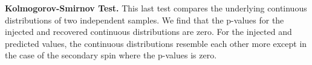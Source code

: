 \documentclass[aps,prd,twocolumn,superscriptaddress,preprintnumbers,floatfix,nofootinbib]{revtex4-2}
\begin{document}
\textbf{Kolmogorov-Smirnov Test.} This last test compares the underlying 
continuous distributions of two independent samples. We find that the p-values
for the injected and recovered continuous distributions are zero. For the
injected and predicted values, the continuous distributions resemble each other
more except in the case of the secondary spin where the p-values is zero.

\end{document}
